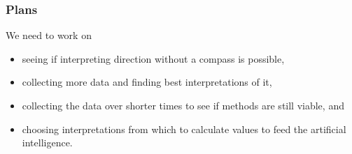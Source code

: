 \documentclass{beamer}
\begin{document}

\begin{frame}
  \frametitle{Plans}
  We need to work on
  \begin{itemize}
  \item seeing if interpreting direction without a compass is
    possible,
  \item collecting more data and finding best interpretations of it,
  \item collecting the data over shorter times to see if methods are
    still viable, and
  \item choosing interpretations from which to calculate values to
    feed the artificial intelligence.
  \end{itemize}
\end{frame}
\end{document}
